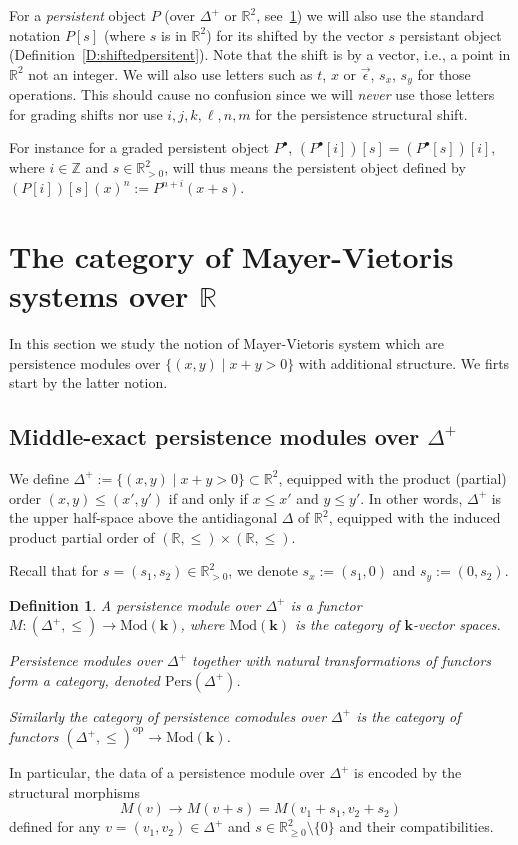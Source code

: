 \documentclass[a4paper, english, 11pt]{article}
\newcommand{\kk}[0]{\textbf{k}}
\newcommand{\Mod}[0]{\text{Mod}}
\newcommand{\0}{\vec{0}}
\newcommand{\R}[0]{\mathbb{R}}
\newcommand{\Z}[0]{\mathbb{Z}}
\newcommand{\op}[0]{\text{op}}
\newcommand{\Pers}[0]{\text{Pers}}
\newtheorem{defi}[prop]{Definition}
\begin{document}
\smallskip

 For a \emph{persistent} object $P$ (over $\Delta^+$ or $\R^2$, see~\ref{D:PerModule}) we will also use the standard notation $P[s]$ (where $s$ is in $\R^2$) for its shifted by the vector $s$ persistant object (Definition~\ref{D:shiftedpersitent}). Note that the shift is by a vector, i.e., a point in $\R^2$ not an integer.  We will also use letters such as $t$, $x$ or $\vec{\epsilon}$, $s_x$, $s_y$ for those operations.  This should cause no confusion since we will \emph{never} use those letters for grading shifts nor use $i,j,k,\ell, n, m$ for the persistence structural shift. 
 
 \smallskip
 
 For instance for a graded persistent object $P^\bullet$, $(P^\bullet[i])[s]=(P^\bullet[s])[i]$, where $i\in \Z$ and $s\in \R^2_{>0}$, will thus means the  persistent object defined by $(P[i])[s] (x)^n:= P^{n+i}(x+s)$.

\section{The category of Mayer-Vietoris systems over $\R$}
In this section we study the notion of Mayer-Vietoris system which are persistence modules over $\{(x,y)\mid x+y > 0\}$ with additional structure. We firts start by the latter notion. 
\subsection{Middle-exact persistence modules over $\Delta^+$}

We define $\Delta^+ := \{(x,y)\mid x+y > 0\}\subset \R^2$, equipped with the product (partial) order $(x,y)\leq (x',y')$ if and only if $x\leq x'$ and $y\leq y' $. 
In other words, $\Delta^+$ is the upper half-space above the antidiagonal $\Delta$ of $\R^2$, equipped with the induced product partial order of $(\R, \leq)\times (\R, \leq)$.

\smallskip

Recall that for $s=(s_1,s_2)\in \R^2_{>0}$, we denote $s_x:=(s_1,0)$ and $s_y := (0,s_2)$. 

\begin{defi}\label{D:PerModule}
A \emph{persistence module} over $\Delta^+$ is a functor $M : (\Delta^+,\leq) \longrightarrow \Mod(\kk)$, where $\Mod(\kk)$ is the category of $\kk$-vector spaces.

Persistence modules over $\Delta^+$ together with natural transformations of functors form a category, denoted $\Pers(\Delta^+)$.

Similarly the category of \emph{persistence comodules} over $\Delta^+$ is the category of functors $(\Delta^+,\leq)^{\op} \longrightarrow \Mod(\kk)$.
\end{defi}
In particular, the data of a  persistence module over $\Delta^+$ is encoded by the  structural  morphisms  
\begin{equation}\label{eq:structmorphism}
    M(v) \longrightarrow M(v+s)= M(v_1+s_1, v_2+s_2)
\end{equation}
defined for any $v=(v_1,v_2)\in \Delta^+$ and $s\in \R^2_{\geq0}\setminus\{0\}$ and their compatibilities. 
\end{document}
